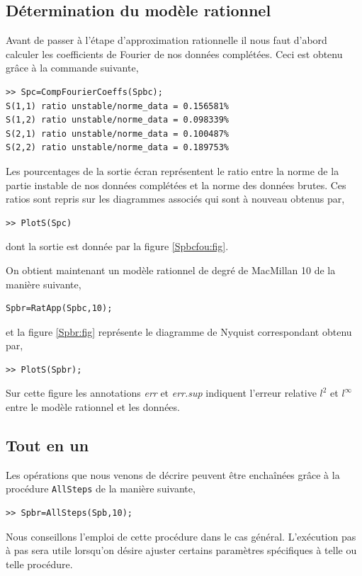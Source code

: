 \documentclass[12]{article}
\begin{document}
\subsection{D\'etermination du mod\`ele rationnel}

Avant de passer \`a l'\'etape d'approximation rationnelle il nous faut
d'abord calculer les coefficients de Fourier de nos donn\'ees
compl\'et\'ees. Ceci est obtenu gr\^ace \`a la commande suivante,

\begin{verbatim}
>> Spc=CompFourierCoeffs(Spbc);
S(1,1) ratio unstable/norme_data = 0.156581%
S(1,2) ratio unstable/norme_data = 0.098339%
S(2,1) ratio unstable/norme_data = 0.100487%
S(2,2) ratio unstable/norme_data = 0.189753%   
\end{verbatim}

Les pourcentages de la sortie \'ecran repr\'esentent le ratio
entre la norme de la partie instable de nos donn\'ees compl\'et\'ees et
la norme des donn\'ees brutes. Ces ratios sont repris sur les
diagrammes associ\'es qui sont \`a nouveau obtenus par,

\begin{verbatim}
>> PlotS(Spc)
\end{verbatim}
dont la sortie est donn\'ee par la figure \ref{Spbcfou:fig}.

On obtient maintenant un mod\`ele rationnel de degr\'e de MacMillan 10 de
la mani\`ere suivante,

\begin{verbatim} 
Spbr=RatApp(Spbc,10);
\end{verbatim}
et la figure \ref{Spbr:fig} repr\'esente le diagramme de Nyquist correspondant
obtenu par,

\begin{verbatim}
>> PlotS(Spbr);
\end{verbatim}
Sur cette figure les annotations {\it err} et {\it err.sup} indiquent
l'erreur relative $l^2$ et $l^{\infty}$ entre le mod\`ele rationnel et les 
donn\'ees. 

\subsection{Tout en un}

Les op\'erations que nous venons de d\'ecrire peuvent \^etre encha\^in\'ees
gr\^ace \`a la proc\'edure \verb+AllSteps+ de la mani\`ere suivante,

\begin{verbatim}
>> Spbr=AllSteps(Spb,10);
\end{verbatim}
Nous conseillons l'emploi de cette proc\'edure dans le cas
g\'en\'eral. L'ex\'ecution pas \`a pas sera utile lorsqu'on d\'esire 
ajuster certains param\`etres sp\'ecifiques \`a telle ou telle proc\'edure. 
\end{document}
